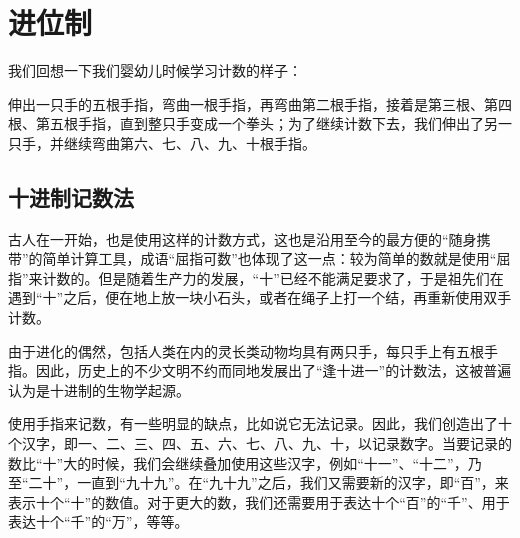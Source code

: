 \section{进位制}\label{sec:NumberSystemBasics/PositionalNotation}
    我们回想一下我们婴幼儿时候学习计数的样子：

    伸出一只手的五根手指，弯曲一根手指，再弯曲第二根手指，接着是第三根、第四根、第五根手指，直到整只手变成一个拳头；为了继续计数下去，我们伸出了另一只手，并继续弯曲第六、七、八、九、十根手指。

    \subsection{十进制记数法}\label{subsec:NumberSystemBasics/PositionalNotation/Decimal}
        古人在一开始，也是使用这样的计数方式，这也是沿用至今的最方便的“随身携带”的简单计算工具，成语“屈指可数”也体现了这一点：较为简单的数就是使用“屈指”来计数的。但是随着生产力的发展，“十”已经不能满足要求了，于是祖先们在遇到“十”之后，便在地上放一块小石头，或者在绳子上打一个结，再重新使用双手计数。

        由于进化的偶然，包括人类在内的灵长类动物均具有两只手，每只手上有五根手指。因此，历史上的不少文明不约而同地发展出了“逢十进一”的计数法，这被普遍认为是十进制的生物学起源。

        使用手指来记数，有一些明显的缺点，比如说它无法记录。因此，我们创造出了十个汉字，即一、二、三、四、五、六、七、八、九、十，以记录数字。当要记录的数比“十”大的时候，我们会继续叠加使用这些汉字，例如“十一”、“十二”，乃至“二十”，一直到“九十九”。在“九十九”之后，我们又需要新的汉字，即“百”，来表示十个“十”的数值。对于更大的数，我们还需要用于表达十个“百”的“千”、用于表达十个“千”的“万”，等等。

